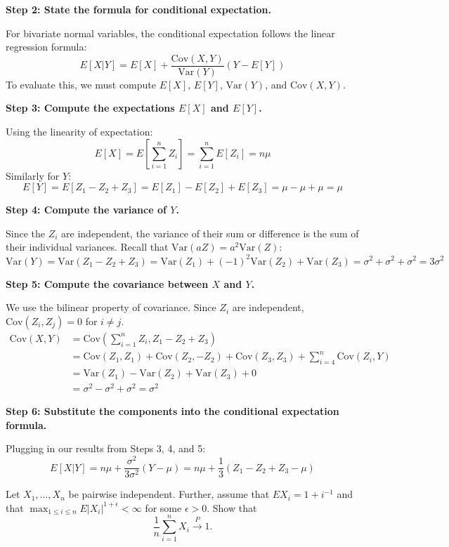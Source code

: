 \begin{solution}
\textbf{Step 2: State the formula for conditional expectation.}

For bivariate normal variables, the conditional expectation follows the linear regression formula:
\[ E[X|Y] = E[X] + \frac{\text{Cov}(X, Y)}{\text{Var}(Y)} (Y - E[Y]) \]
To evaluate this, we must compute $E[X]$, $E[Y]$, $\text{Var}(Y)$, and $\text{Cov}(X, Y)$.

\textbf{Step 3: Compute the expectations $E[X]$ and $E[Y]$.}

Using the linearity of expectation:
\[ E[X] = E\left[\sum_{i=1}^n Z_i\right] = \sum_{i=1}^n E[Z_i] = n\mu \]
Similarly for $Y$:
\[ E[Y] = E[Z_1 - Z_2 + Z_3] = E[Z_1] - E[Z_2] + E[Z_3] = \mu - \mu + \mu = \mu \]

\textbf{Step 4: Compute the variance of $Y$.}

Since the $Z_i$ are independent, the variance of their sum or difference is the sum of their individual variances. Recall that $\text{Var}(aZ) = a^2\text{Var}(Z)$:
\[ \text{Var}(Y) = \text{Var}(Z_1 - Z_2 + Z_3) = \text{Var}(Z_1) + (-1)^2\text{Var}(Z_2) + \text{Var}(Z_3) = \sigma^2 + \sigma^2 + \sigma^2 = 3\sigma^2 \]

\textbf{Step 5: Compute the covariance between $X$ and $Y$.}

We use the bilinear property of covariance. Since $Z_i$ are independent, $\text{Cov}(Z_i, Z_j) = 0$ for $i \neq j$.
\begin{align*}
\text{Cov}(X, Y) &= \text{Cov}\left(\sum_{i=1}^n Z_i, Z_1 - Z_2 + Z_3\right) \\
&= \text{Cov}(Z_1, Z_1) + \text{Cov}(Z_2, -Z_2) + \text{Cov}(Z_3, Z_3) + \sum_{i=4}^n \text{Cov}(Z_i, Y) \\
&= \text{Var}(Z_1) - \text{Var}(Z_2) + \text{Var}(Z_3) + 0 \\
&= \sigma^2 - \sigma^2 + \sigma^2 = \sigma^2
\end{align*}

\textbf{Step 6: Substitute the components into the conditional expectation formula.}

Plugging in our results from Steps 3, 4, and 5:
\[ E[X|Y] = n\mu + \frac{\sigma^2}{3\sigma^2} (Y - \mu) = n\mu + \frac{1}{3}(Z_1 - Z_2 + Z_3 - \mu) \]
\end{solution}

\begin{exercise}\label{probability:2010:2}
Let $X_1, \dots, X_n$ be pairwise independent. Further, assume that $E X_i = 1 + i^{-1}$ and that $\max_{1 \leq i \leq n} E |X_i|^{1+\epsilon} < \infty$ for some $\epsilon > 0$. Show that
\[ \frac{1}{n} \sum_{i=1}^n X_i \xrightarrow{P} 1. \]
\end{exercise}

